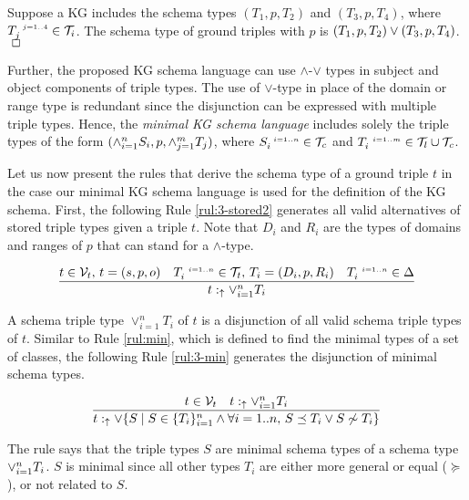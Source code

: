 \documentclass[runningheads]{llncs}
\newcommand{\s}{\scriptscriptstyle\ \,}
\newcommand{\uarr}{\uparrow}
\newcommand{\V}{{\cal V}}
\newcommand{\T}{{\cal T}}
\newcommand{\finbox}{\phantom{.}\hfill\Box}
\begin{document}
\begin{example}
  Suppose a KG includes the schema types $(T_1,p,T_2)$ and
  $(T_3,p,T_4)$, where $T_j^{\s\/j=1..4}\in\T_i$. The schema type of
  ground triples with  $p$ is
  $(T_1,p,T_2)\lor\/(T_3,p,T_4)$. $\finbox$
\end{example}

Further, the proposed KG schema language can use $\land$-$\lor$ types
in subject and object components of triple types. The use of
$\lor$-type in place of the domain or range type is redundant since
the disjunction can be expressed with multiple triple types. Hence,
the \emph{minimal KG schema language} includes solely the triple types
of the form $(\land_{i=1}^n\/S_i,p,\land_{j=1}^m\/T_j)$, where
$S_i^{\s\/i=1..n}\in\T_c$ and $T_i^{\s\/i=1..m}\in\T_l\cup\T_c$.

Let us now present the rules that derive the schema type of a ground
triple $t$ in the case our minimal KG schema language is used for the
definition of the KG schema. First, the following Rule
\ref{rul:3-stored2} generates all valid alternatives of stored triple
types given a triple $t$. Note that $D_i$ and $R_i$ are the types of
domains and ranges of $p$ that can stand for a $\land$-type.

\begin{equation}
\label{rul:3-stored2}
\dfrac{t\in\V_t,\, t=(s,p,o)\quad T_i^{\s\/i=1..n}\in\T_t,\, T_i=(D_i,p,R_i)\quad\/T_i^{\s\/i=1..n}\in\Delta}
      {t:_\uarr\/\lor_{i=1}^n\/T_i}
\end{equation}

A schema triple type $\lor_{i=1}^nT_i$ of $t$ is a disjunction of
all valid schema triple types of $t$. Similar to Rule \ref{rul:min},
which is defined to find the minimal types of a set of classes, the
following Rule \ref{rul:3-min} generates the disjunction of minimal
schema types.

\begin{equation}
\label{rul:3-min}
\dfrac{t\in\V_t\quad\/t:_\uarr\lor_{i=1}^n\/T_i}
      {t:_{\uarr}\lor\{S \mid S\in\/\{T_i\}_{i=1}^n\land\forall\/i=1..n,\, S\preceq\/T_i\lor\/S\not\sim\/T_i\}}
\end{equation}

The rule says that the triple types $S$ are minimal schema types of a
schema type $\lor_{i=1}^n\/T_i$. $S$ is minimal since all other
types $T_i$ are either more general or equal ($\succeq$), or not
related to $S$. 
\end{document}

